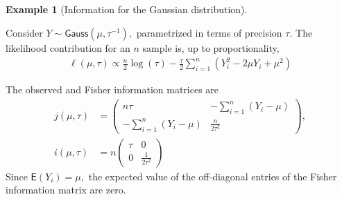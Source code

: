 \documentclass[
  11pt,
  letterpaper,
]{scrbook}
\theoremstyle{definition}
\newtheorem{example}{Example}[chapter]
\theoremstyle{plain}
\theoremstyle{plain}
\theoremstyle{plain}
\theoremstyle{definition}
\theoremstyle{definition}
\theoremstyle{plain}
\theoremstyle{plain}
\theoremstyle{remark}
\begin{document}
\begin{example}[Information for the Gaussian
distribution]\protect\hypertarget{exm-gauss}{}\label{exm-gauss}

Consider \(Y \sim \mathsf{Gauss}(\mu, \tau^{-1}),\) parametrized in
terms of precision \(\tau.\) The likelihood contribution for an \(n\)
sample is, up to proportionality, \begin{align*}
\ell(\mu, \tau) \propto \frac{n}{2}\log(\tau) - \frac{\tau}{2}\sum_{i=1}^n(Y_i^2-2\mu Y_i+\mu^2)
\end{align*}

The observed and Fisher information matrices are \begin{align*}
j(\mu, \tau) &= \begin{pmatrix}
n\tau & -\sum_{i=1}^n (Y_i-\mu)\\
-\sum_{i=1}^n (Y_i-\mu) & \frac{n}{2\tau^2}
\end{pmatrix}, \\
i(\mu, \tau) &= n\begin{pmatrix}
\tau & 0\\
0 & \frac{1}{2\tau^2}
\end{pmatrix}
\end{align*} Since \(\mathsf{E}(Y_i) = \mu,\) the expected value of the
off-diagonal entries of the Fisher information matrix are zero.

\end{example}
\end{document}
